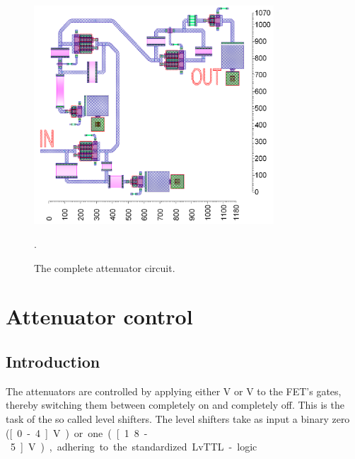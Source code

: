 		\begin{figure}[h!]
			\centering
			\includegraphics[width=0.8\textwidth]{fig/attenuators/attenuators_layout}
			\caption[Attenuator circuit layout]{The complete attenuator circuit.\scalemum}\label{fig:attenuators_layout}.
		\end{figure}

	
				


		

\section{Attenuator control}

	\subsection{Introduction}
		The attenuators are controlled by applying either \unit[5]{V} or \unit[3]{V} to the FET's gates, thereby switching them between completely on and completely off. This is the task of the so called level shifters. The level shifters take as input a binary zero (\unit[0-.4]{V}) or one (\unit[1.8-5]{V}), adhering to the standardized LvTTL-logic.\autocite{lvttl11} %
		
